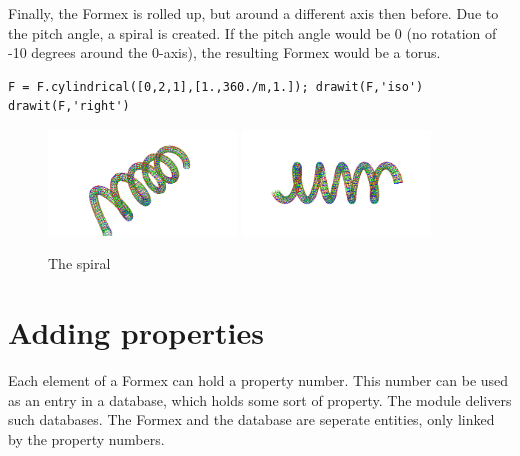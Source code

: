 Finally, the Formex is rolled up, but around a different axis then before. 
Due to the pitch angle, a spiral is created. If the pitch angle would be 0 
(no rotation of -10 degrees around the 0-axis), the resulting Formex 
would be a torus. 
\begin{verbatim}
F = F.cylindrical([0,2,1],[1.,360./m,1.]); drawit(F,'iso')
drawit(F,'right')
\end{verbatim}
 \begin{figure}[ht]
   \centering
   \begin{makeimage}
   \end{makeimage}
   \begin{latexonly}
     \includegraphics[width=5cm]{images/spiral-007}
     \includegraphics[width=5cm]{images/spiral-008}
   \end{latexonly}
   \begin{htmlonly}
   \end{htmlonly}  
   \caption{The spiral}
 \end{figure}

\section{Adding properties}
\label{sec:props}
Each element of a Formex can hold a property number. This number can be used as an entry in a database, which holds some sort of property. The module  delivers such databases. The Formex and the database are seperate entities, only linked by the property numbers. 

